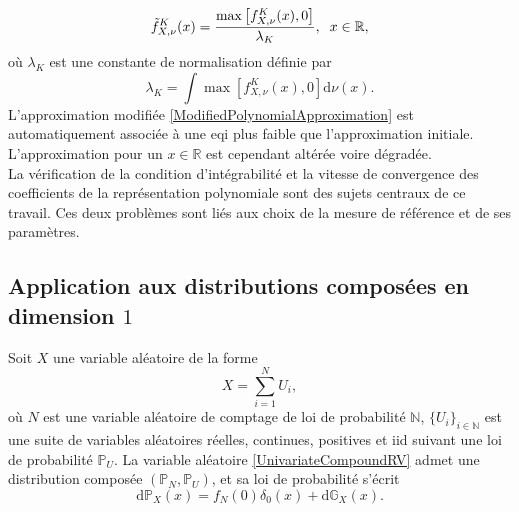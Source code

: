 \begin{equation}\label{ModifiedPolynomialApproximation}
\tilde{f}_{X,\nu}^{K}(x)=\frac{\max\left[f_{X,\nu}^{K}(x),0\right]}{\lambda_{K}},\hspace{0.2cm}x\in\mathbb{R},
\end{equation}
où $\lambda_{K}$ est une constante de normalisation définie par
\begin{equation}
\lambda_{K}=\int\max\left[f_{X,\nu}^{K}(x),0\right]\text{d}\nu(x).
\end{equation}
L'approximation modifiée \eqref{ModifiedPolynomialApproximation} est automatiquement associée à une \gls{eqi} plus faible que l'approximation initiale. L'approximation pour un $x\in\mathbb{R}$ est cependant altérée voire dégradée.\\

La vérification de la condition d'intégrabilité et la vitesse de convergence des coefficients de la représentation polynomiale sont des sujets centraux de ce travail. Ces deux problèmes sont liés aux choix  de la mesure de référence et de ses paramètres. 

\subsection{Application aux distributions composées en dimension $1$}
Soit $X$ une variable aléatoire de la forme
\begin{equation}\label{UnivariateCompoundRV}
X=\sum_{i=1}^{N}U_{i},
\end{equation}
où $N$ est une variable aléatoire de comptage de loi de probabilité $\mathbb{N}$, $\{U_{i}\}_{i\in\mathbb{N}}$ est une suite de variables aléatoires réelles, continues, positives et \gls{iid} suivant une loi de probabilité $\mathbb{P}_{U}$. La variable aléatoire \eqref{UnivariateCompoundRV} admet une distribution composée $(\mathbb{P}_{N},\mathbb{P}_{U})$, et sa loi de probabilité s'écrit
\begin{equation}\label{CompoundDistributionProbability}
\text{d}\mathbb{P}_{X}(x)=f_{N}(0)\delta_{0}(x)+\text{d}\mathbb{G}_{X}(x).
\end{equation}
